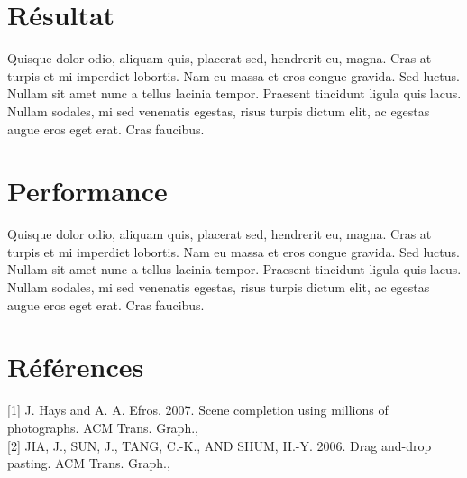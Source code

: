 \documentclass[a4paper]{article}
\begin{document}
\section{Résultat}

Quisque dolor odio, aliquam quis, placerat sed, hendrerit eu, magna. Cras at
turpis et mi imperdiet lobortis. Nam eu massa et eros congue gravida. Sed
luctus. Nullam sit amet nunc a tellus lacinia tempor. Praesent tincidunt ligula
quis lacus. Nullam sodales, mi sed venenatis egestas, risus turpis dictum elit,
ac egestas augue eros eget erat. Cras faucibus.

\section{Performance}

Quisque dolor odio, aliquam quis, placerat sed, hendrerit eu, magna. Cras at
turpis et mi imperdiet lobortis. Nam eu massa et eros congue gravida. Sed
luctus. Nullam sit amet nunc a tellus lacinia tempor. Praesent tincidunt ligula
quis lacus. Nullam sodales, mi sed venenatis egestas, risus turpis dictum elit,
ac egestas augue eros eget erat. Cras faucibus.

\section{Références}

[1] J. Hays and A. A. Efros.  2007. Scene completion using millions of photographs. ACM Trans. Graph.,
\\

[2] JIA, J., SUN, J., TANG, C.-K., AND SHUM, H.-Y. 2006. Drag and-drop pasting. ACM Trans. Graph.,
\end{document}
